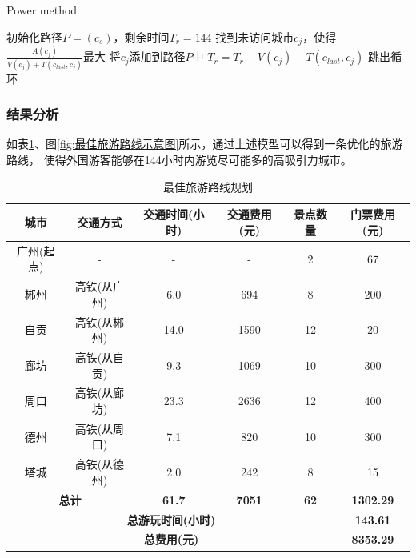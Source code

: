 \documentclass[withoutpreface,bwprint]{cumcmthesis} %
\begin{document}
\begin{algorithm}[H]
    \renewcommand{\algorithmicrequire}{\textbf{Input:}}
	\renewcommand{\algorithmicensure}{\textbf{Output:}}
	\caption{Power method}
    \label{power}
    \begin{algorithmic}[1] %
\STATE 初始化路径$P = (c_s)$，剩余时间$T_r = 144$
    \STATE 找到未访问城市$c_j$，使得$\frac{A(c_j)}{V(c_j) + T(c_{last}, c_j)}$最大
        \STATE 将$c_j$添加到路径$P$中
        \STATE $T_r = T_r - V(c_j) - T(c_{last}, c_j)$
    \ELSE
        \STATE 跳出循环
    \ENDIF
\ENDWHILE
\end{algorithmic}
\end{algorithm}

\subsubsection{结果分析}

如表\ref{tab:最佳旅游路线规划}、图\ref{fig:最佳旅游路线示意图}所示，通过上述模型可以得到一条优化的旅游路线，
使得外国游客能够在144小时内游览尽可能多的高吸引力城市。

\begin{table}[H]
  \centering
  \caption{最佳旅游路线规划}
  \label{tab:最佳旅游路线规划}
  \begin{tabular}{|c|c|c|c|c|c|}
    \hline
    \textbf{城市} & \textbf{交通方式} & \textbf{交通时间(小时)} & \textbf{交通费用(元)} & \textbf{景点数量} & \textbf{门票费用(元)} \\
    \hline
    广州(起点) & - & - & - & 2 & 67 \\
    \hline
    郴州 & 高铁(从广州) & 6.0 & 694 & 8 & 200 \\
    \hline
    自贡 & 高铁(从郴州) & 14.0 & 1590 & 12 & 20 \\
    \hline
    廊坊 & 高铁(从自贡) & 9.3 & 1069 & 10 & 300 \\
    \hline
    周口 & 高铁(从廊坊) & 23.3 & 2636 & 12 & 400 \\
    \hline
    德州 & 高铁(从周口) & 7.1 & 820 & 10 & 300 \\
    \hline
    塔城 & 高铁(从德州) & 2.0 & 242 & 8 & 15 \\
    \hline
    \multicolumn{2}{|c|}{\textbf{总计}} & \textbf{61.7} & \textbf{7051} & \textbf{62} & \textbf{1302.29} \\
    \hline
    \multicolumn{5}{|c|}{\textbf{总游玩时间(小时)}} & \textbf{143.61} \\
    \hline
    \multicolumn{5}{|c|}{\textbf{总费用(元)}} & \textbf{8353.29} \\
    \hline
  \end{tabular}
\end{table}
\end{document}
